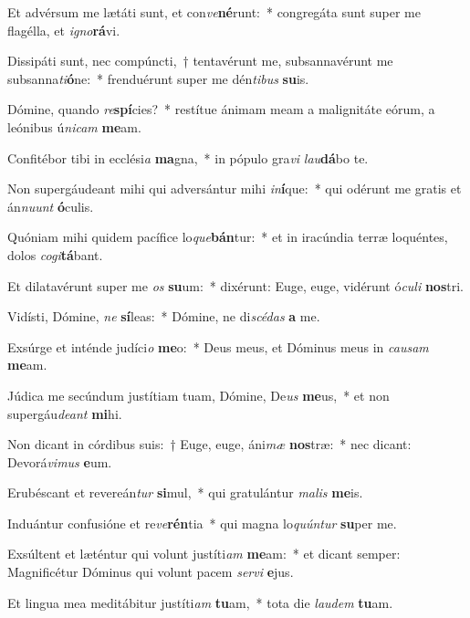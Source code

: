 \item Et advérsum me lætáti sunt, et con\textit{ve}\textbf{né}runt:~* congregáta sunt super me flagélla, et \textit{i}\textit{gno}\textbf{rá}vi.
\item Dissipáti sunt, nec compúncti,~† tentavérunt me, subsannavérunt me subsanna\textit{ti}\textbf{ó}ne:~* frenduérunt super me dén\textit{ti}\textit{bus} \textbf{su}is.
\item Dómine, quando \textit{re}\textbf{spí}cies?~* restítue ánimam meam a malignitáte eórum, a leónibus ú\textit{ni}\textit{cam} \textbf{me}am.
\item Confitébor tibi in ecclési\textit{a} \textbf{ma}gna,~* in pópulo gra\textit{vi} \textit{lau}\textbf{dá}bo te.
\item Non supergáudeant mihi qui adversántur mihi \textit{in}\textbf{í}que:~* qui odérunt me gratis et án\textit{nu}\textit{unt} \textbf{ó}culis.
\item Quóniam mihi quidem pacífice lo\textit{que}\textbf{bán}tur:~* et in iracúndia terræ loquéntes, dolos \textit{co}\textit{gi}\textbf{tá}bant.
\item Et dilatavérunt super me \textit{os} \textbf{su}um:~* dixérunt: Euge, euge, vidérunt ó\textit{cu}\textit{li} \textbf{nos}tri.
\item Vidísti, Dómine, \textit{ne} \textbf{sí}leas:~* Dómine, ne di\textit{scé}\textit{das} \textbf{a} me.
\item Exsúrge et inténde judíci\textit{o} \textbf{me}o:~* Deus meus, et Dóminus meus in \textit{cau}\textit{sam} \textbf{me}am.
\item Júdica me secúndum justítiam tuam, Dómine, De\textit{us} \textbf{me}us,~* et non supergáu\textit{de}\textit{ant} \textbf{mi}hi.
\item Non dicant in córdibus suis:~† Euge, euge, áni\textit{mæ} \textbf{nos}træ:~* nec dicant: Devorá\textit{vi}\textit{mus} \textbf{e}um.
\item Erubéscant et revereán\textit{tur} \textbf{si}mul,~* qui gratulántur \textit{ma}\textit{lis} \textbf{me}is.
\item Induántur confusióne et re\textit{ve}\textbf{rén}tia~* qui magna lo\textit{quún}\textit{tur} \textbf{su}per me.
\item Exsúltent et læténtur qui volunt justíti\textit{am} \textbf{me}am:~* et dicant semper: Magnificétur Dóminus qui volunt pacem \textit{ser}\textit{vi} \textbf{e}jus.
\item Et lingua mea meditábitur justíti\textit{am} \textbf{tu}am,~* tota die \textit{lau}\textit{dem} \textbf{tu}am.
